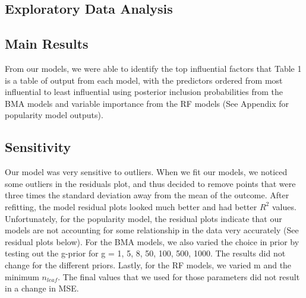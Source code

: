 \documentclass{article}
\begin{document}
\subsection{Exploratory Data Analysis} 

\subsection{Main Results} 

From our models, we were able to identify the top influential factors that  Table 1 is a table of output from each model, with the predictors ordered from most influential to least influential using posterior inclusion probabilities from the BMA models and variable importance from the RF models (See Appendix for popularity model outputs).


\subsection{Sensitivity} 
Our model was very sensitive to outliers. When we fit our models, we noticed some outliers in the residuals plot, and thus decided to remove points that were three times the standard deviation away from the mean of the outcome. After refitting, the model residual plots looked much better and had better $R^2$ values. Unfortunately, for the popularity model, the residual plots indicate that our models are not accounting for some relationship in the data very accurately (See residual plots below). For the BMA models, we also varied the choice in prior by testing out the g-prior for g = 1, 5, 8, 50, 100, 500, 1000. The results did not change for the different priors. Lastly, for the RF models, we varied m and the minimum $n_{leaf}$. The final values that we used for those parameters did not result in a change in MSE. 
\end{document}
